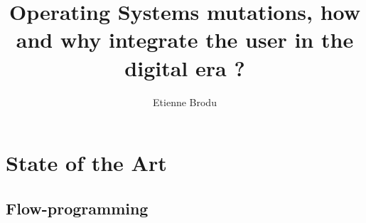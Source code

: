 \documentclass[12pt]{report}
\begin{document}
\title{Operating Systems mutations, how and why integrate the user in the digital era ?\\}
\author{Etienne Brodu}

\maketitle



\tableofcontents




\chapter{State of the Art}
  \section{}
  \section{Flow-programming}






\printbibliography[]
\end{document}

